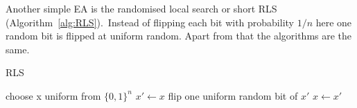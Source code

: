 Another simple EA is the randomised local search or short RLS (Algorithm~\ref{alg:RLS}).\
Instead of flipping each bit with probability $1/n$ here one random bit is flipped at uniform random.
Apart from that the algorithms are the same.
\begin{algorithm}[bt]
      \caption{\textsc{RLS}}\label{alg:RLS}

      \DontPrintSemicolon %

      \BlankLine
      choose x uniform from ${\{0,1\}}^n$\;
      {
      $x' \leftarrow x$\;
      flip one uniform random bit of $x'$\;
      {
      {
            $x \leftarrow x'$\;
      }
      }
      }
\end{algorithm}

